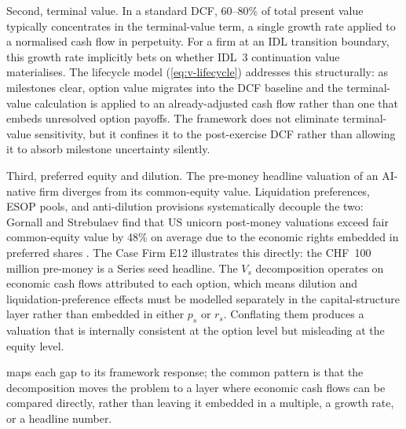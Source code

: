 \documentclass[oneside,10pt]{swissi}
\begin{document}
Second, terminal value. In a standard DCF, 60--80\% of total present value typically concentrates in the terminal-value term, a single growth rate applied to a normalised cash flow in perpetuity. For a firm at an IDL transition boundary, this growth rate implicitly bets on whether IDL~3 continuation value materialises. The lifecycle model (\cref{eq:v-lifecycle}) addresses this structurally: as milestones clear, option value migrates into the DCF baseline and the terminal-value calculation is applied to an already-adjusted cash flow rather than one that embeds unresolved option payoffs. The framework does not eliminate terminal-value sensitivity, but it confines it to the post-exercise DCF rather than allowing it to absorb milestone uncertainty silently.

Third, preferred equity and dilution. The pre-money headline valuation of an AI-native firm diverges from its common-equity value. Liquidation preferences, ESOP pools, and anti-dilution provisions systematically decouple the two: Gornall and Strebulaev find that US unicorn post-money valuations exceed fair common-equity value by 48\% on average due to the economic rights embedded in preferred shares \autocite{gornall2020squaring}. The Case Firm E12 illustrates this directly: the CHF~100 million pre-money is a Series seed headline. The $V_s$ decomposition operates on economic cash flows attributed to each option, which means dilution and liquidation-preference effects must be modelled separately in the capital-structure layer rather than embedded in either $p_s$ or $r_s$. Conflating them produces a valuation that is internally consistent at the option level but misleading at the equity level.

 maps each gap to its framework response; the common pattern is that the decomposition moves the problem to a layer where economic cash flows can be compared directly, rather than leaving it embedded in a multiple, a growth rate, or a headline number.
\end{document}
